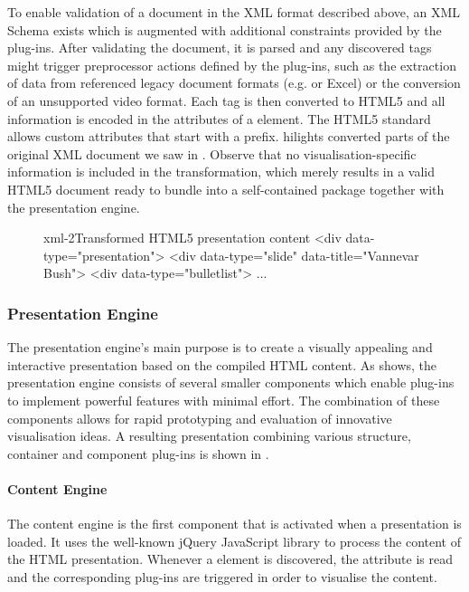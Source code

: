      To enable validation of a \mxp document in the XML format described above,
     an XML Schema exists which is augmented with additional constraints
     provided by the plug-ins. After validating the document, it is parsed and
     any discovered tags might trigger preprocessor actions defined by the
     plug-ins, such as the extraction of data from referenced legacy document
     formats (e.g. \ppt or Excel) or the conversion of an unsupported video
     format. Each tag is then converted to HTML5 and all information is encoded
     in the attributes of a  element. The HTML5 standard allows
     custom attributes that start with a  prefix. 
     hilights converted parts of the original XML document we saw in
     . Observe that no visualisation-specific information is
     included in the transformation, which merely results in a valid HTML5
     document ready to bundle into a self-contained package together with the
     presentation engine.

     \begin{figure}[h!]
      \begin{lstxml}{xml-2}{Transformed HTML5 presentation content}
<div data-type="presentation">
  <div data-type="slide" data-title="Vannevar Bush">
    <div data-type="bulletlist">
      ...
      \end{lstxml}
     \end{figure}

    \subsubsection{Presentation Engine}

     The presentation engine's main purpose is to create a visually appealing
     and interactive presentation based on the compiled HTML content. As
      shows, the presentation engine consists of several
     smaller components which enable plug-ins to implement powerful features
     with minimal effort. The combination of these components allows for rapid
     prototyping and evaluation of innovative visualisation ideas. A resulting
     \mxp presentation combining various structure, container and component
     plug-ins is shown in .


     \paragraph{Content Engine} The content engine is the first component that
      is activated when a presentation is loaded. It uses the well-known
      jQuery JavaScript library to process the content of the HTML
      presentation. Whenever a  element is discovered, the
       attribute is read and the corresponding plug-ins are
      triggered in order to visualise the content.

